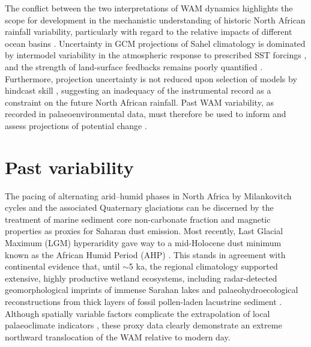 \documentclass[a4paper]{article}
\begin{document}
The conflict between the two interpretations of WAM dynamics highlights the scope for development in the mechanistic understanding of historic North African rainfall variability, particularly with regard to the relative impacts of different ocean basins \parencite{lafore2011progress, roehrig2013present, nicholson2013west, rodriguez2015variability, martin2016understanding}.
Uncertainty in GCM projections of Sahel climatology is dominated by intermodel variability in the atmospheric response to prescribed SST forcings \parencite{cook2006coupled, druyan2011studies, roehrig2013present, lee2014future, chadwick2016aspects}, and the strength of land-surface feedbacks remains poorly quantified \parencite{nicholson2000land, taylor2011new}. 
Furthermore, projection uncertainty is not reduced upon selection of models by hindcast skill \parencite{rowell2016can}, suggesting an inadequacy of the instrumental record as a constraint on the future North African rainfall.
Past WAM variability, as recorded in palaeoenvironmental data, must therefore be used to inform and assess projections of potential change \parencite{braconnot2012evaluation, mohtadi2016palaeoclimatic}.

\section*{Past variability}

The pacing of alternating arid--humid phases in North Africa by Milankovitch cycles and the associated Quaternary glaciations can be discerned by the treatment of marine sediment core non-carbonate fraction \parencite{tiedemann1989climatic, tiedemann1994astronomic} and magnetic properties \parencite{bloemendal1989evidence, larrasoana2003three} as proxies for Saharan dust emission.
Most recently, Last Glacial Maximum (LGM) hyperaridity gave way to a mid-Holocene dust minimum known as the African Humid Period (AHP) \parencite{rea1994paleoclimatic, demenocal2000abrupt, adkins2006african}.
This stands in agreement with continental evidence that, until $\sim$5 ka, the regional climatology supported extensive, highly productive wetland ecosystems, including radar-detected geomorphological imprints of immense Sarahan lakes \parencite{schuster2005holocene, drake2006shorelines} and palaeohydroecological reconstructions from thick layers of fossil pollen-laden lacustrine sediment \parencite{ritchie1985sediment, lezine1990across, jolly1998biome}. 
Although spatially variable factors complicate the extrapolation of local palaeoclimate indicators \parencite{baumhauer1991palaeolakes}, these proxy data clearly demonstrate an extreme northward translocation of the WAM relative to modern day.
\end{document}
